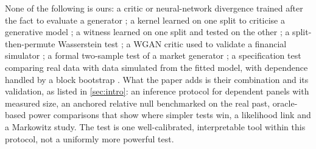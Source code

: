 None of the following is ours: a critic or neural-network divergence trained after the fact to
evaluate a generator \citep{im_2018_quantitatively,gulrajani_2019_towards}; a kernel learned on one
split to criticise a generative model \citep{sutherland_2017_generative}; a witness learned on one
split and tested on the other
\citep{kubler2022witness,kirchler2020two,cheng2022classification}; a split-then-permute
Wasserstein test \citep{wang2022two}; a WGAN critic used to validate a financial simulator
\citep{bai2026calibrating}; a formal two-sample test of a market generator
\citep{buehler2020data}; a specification test comparing real data with data simulated from the
fitted model, with dependence handled by a block bootstrap \citep{corradi2005bootstrap}. What the paper
adds is their combination and its validation, as listed in \cref{sec:intro}: an inference protocol
for dependent panels with measured size, an anchored relative null benchmarked on the real past,
oracle-based power comparisons that show where simpler tests win, a likelihood link and a
Markowitz study. The \WC{} test is one well-calibrated, interpretable tool within this protocol,
not a uniformly more powerful test.

